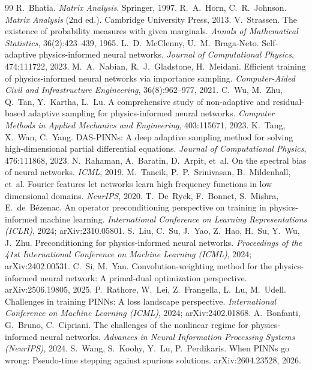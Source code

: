 \documentclass[fontset=windows,11pt]{ctexart}
\numberwithin{equation}{section}
\begin{document}
\begin{thebibliography}{99}
 R.~Bhatia. \emph{Matrix Analysis}. Springer, 1997.
 R.~A.~Horn, C.~R.~Johnson. \emph{Matrix Analysis} (2nd ed.). Cambridge University Press, 2013.
 V.~Strassen. The existence of probability measures with given marginals. \emph{Annals of Mathematical Statistics}, 36(2):423--439, 1965.
 L.~D.~McClenny, U.~M.~Braga-Neto. Self-adaptive physics-informed neural networks. \emph{Journal of Computational Physics}, 474:111722, 2023.
 M.~A.~Nabian, R.~J.~Gladstone, H.~Meidani. Efficient training of physics-informed neural networks via importance sampling. \emph{Computer-Aided Civil and Infrastructure Engineering}, 36(8):962--977, 2021.
 C.~Wu, M.~Zhu, Q.~Tan, Y.~Kartha, L.~Lu. A comprehensive study of non-adaptive and residual-based adaptive sampling for physics-informed neural networks. \emph{Computer Methods in Applied Mechanics and Engineering}, 403:115671, 2023.
 K.~Tang, X.~Wan, C.~Yang. DAS-PINNs: A deep adaptive sampling method for solving high-dimensional partial differential equations. \emph{Journal of Computational Physics}, 476:111868, 2023.
 N.~Rahaman, A.~Baratin, D.~Arpit, et~al. On the spectral bias of neural networks. \emph{ICML}, 2019.
 M.~Tancik, P.~P.~Srinivasan, B.~Mildenhall, et~al. Fourier features let networks learn high frequency functions in low dimensional domains. \emph{NeurIPS}, 2020.
 T.~De~Ryck, F.~Bonnet, S.~Mishra, E.~de~B\'ezenac. An operator preconditioning perspective on training in physics-informed machine learning. \emph{International Conference on Learning Representations (ICLR)}, 2024; arXiv:2310.05801.
 S.~Liu, C.~Su, J.~Yao, Z.~Hao, H.~Su, Y.~Wu, J.~Zhu. Preconditioning for physics-informed neural networks. \emph{Proceedings of the 41st International Conference on Machine Learning (ICML)}, 2024; arXiv:2402.00531.
 C.~Si, M.~Yan. Convolution-weighting method for the physics-informed neural network: A primal-dual optimization perspective. arXiv:2506.19805, 2025.
 P.~Rathore, W.~Lei, Z.~Frangella, L.~Lu, M.~Udell. Challenges in training PINNs: A loss landscape perspective. \emph{International Conference on Machine Learning (ICML)}, 2024; arXiv:2402.01868.
 A.~Bonfanti, G.~Bruno, C.~Cipriani. The challenges of the nonlinear regime for physics-informed neural networks. \emph{Advances in Neural Information Processing Systems (NeurIPS)}, 2024.
 S.~Wang, S.~Koohy, Y.~Lu, P.~Perdikaris. When PINNs go wrong: Pseudo-time stepping against spurious solutions. arXiv:2604.23528, 2026.

\end{thebibliography}
\end{document}
